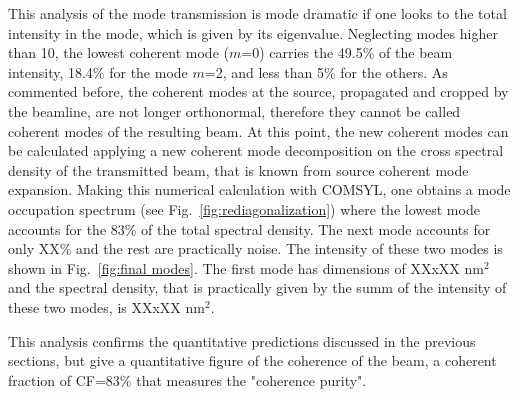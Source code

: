 \documentclass{iucr}              %
\begin{document}
This analysis of the mode transmission is mode dramatic if one looks to the total intensity in the mode, which is given by its eigenvalue. Neglecting modes higher than 10, the lowest coherent mode ($m$=0) carries the 49.5\% of the beam intensity, 18.4\% for the mode $m$=2, and less than 5\% for the others. As commented before, the coherent modes at the source, propagated and cropped by the beamline, are not longer orthonormal, therefore they cannot be called coherent modes of the resulting beam. At this point, the new coherent modes can be calculated applying a new coherent mode decomposition on the cross spectral density of the transmitted beam, that is known from source coherent mode expansion. Making this numerical calculation with COMSYL, one obtains a mode occupation spectrum (see Fig.~\ref{fig:rediagonalization}) where the lowest mode accounts for the 83\% of the total spectral density. The next mode accounts for only XX\% and the rest are practically noise. The intensity of these two modes is shown in Fig.~\ref{fig:final modes}. The first mode has dimensions of XXxXX nm$^2$ and the spectral density, that is practically given by the summ of the intensity of these two modes, is XXxXX nm$^2$.

This analysis confirms the quantitative predictions discussed in the previous sections, but give a quantitative figure of the coherence of the beam, a  coherent fraction of CF=83\% that measures the "coherence purity".


\end{document}
